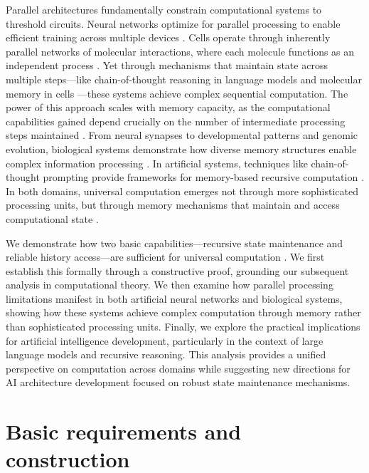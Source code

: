 \documentclass[12pt]{article}
\begin{document}
Parallel architectures fundamentally constrain computational systems to threshold circuits.
Neural networks optimize for parallel processing to enable efficient training across multiple devices \cite{merrill2023parallelism,merrill2024}.
Cells operate through inherently parallel networks of molecular interactions, where each molecule functions as an independent process \cite{fu2023scgrn}.
Yet through mechanisms that maintain state across multiple steps---like chain-of-thought reasoning in language models \cite{wei2022chain,qiu2024ask} and molecular memory in cells \cite{hoel2020emergence}---these systems achieve complex sequential computation.
The power of this approach scales with memory capacity, as the computational capabilities gained depend crucially on the number of intermediate processing steps maintained \cite{merrill2024}.
From neural synapses to developmental patterns and genomic evolution, biological systems demonstrate how diverse memory structures enable complex information processing \cite{burrill2010making,espinosa2024molecular}.
In artificial systems, techniques like chain-of-thought prompting provide frameworks for memory-based recursive computation \cite{wei2022chain,dickson2024trust,ahn2024recursive}.
In both domains, universal computation emerges not through more sophisticated processing units, but through memory mechanisms that maintain and access computational state \cite{schuurmans2024autoregressive}.

We demonstrate how two basic capabilities---recursive state maintenance and reliable history access---are sufficient for universal computation \cite{bennett1989time,boyle2024memory}.
We first establish this formally through a constructive proof, grounding our subsequent analysis in computational theory.
We then examine how parallel processing limitations manifest in both artificial neural networks and biological systems, showing how these systems achieve complex computation through memory rather than sophisticated processing units.
Finally, we explore the practical implications for artificial intelligence development, particularly in the context of large language models and recursive reasoning.
This analysis provides a unified perspective on computation across domains while suggesting new directions for AI architecture development focused on robust state maintenance mechanisms.

\section{Basic requirements and construction}
\end{document}
